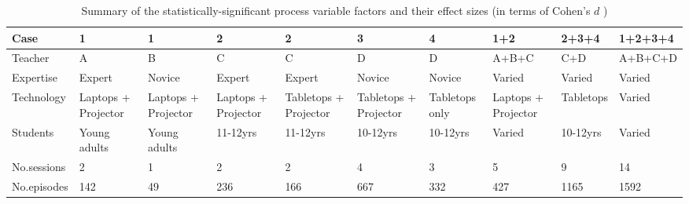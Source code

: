 \documentclass[10pt,journal,compsoc]{IEEEtran}
\begin{document}

\begin{table}[!t]
\caption{Summary of the statistically-significant process variable factors and their effect sizes (in terms of Cohen's $d$ \cite{cohen1977statistical})}
\label{tab:trends}
\centering
\begin{tabular}{|p{3cm}||p{1.2cm}|p{1.2cm}|p{1.2cm}|p{1.2cm}|p{1.2cm}|p{1.2cm}|p{1.2cm}|p{1.2cm}|p{1.2cm}|}
  \hline
Case & 1       & 1       & 2       & 2       & 3       & 4       & 1+2     & 2+3+4   & 1+2+3+4 \\ 
  \hline
  Teacher & A       & B       & C       & C       & D       & D       & A+B+C   & C+D     & A+B+C+D \\ 
  \hline
  Expertise & Expert & Novice & Expert & Expert & Novice & Novice & Varied & Varied & Varied \\ 
  \hline
  Technology & Laptops + Projector   & Laptops + Projector   & Laptops + Projector   & Tabletops + Projector & Tabletops + Projector & Tabletops only      & Laptops + Projector   & Tabletops           & Varied              \\ 
  \hline
  Students & Young adults & Young adults & 11-12yrs     & 11-12yrs     & 10-12yrs     & 10-12yrs     & Varied       & 10-12yrs     & Varied       \\ 
  \hline
  No.sessions &  2 &  1 &  2 &  2 &  4 &  3 &  5 &  9 & 14 \\ 
  \hline
  No.episodes &  142 &   49 &  236 &  166 &  667 &  332 &  427 & 1165 & 1592 \\ 

\end{tabular}
\end{table}
\end{document}
